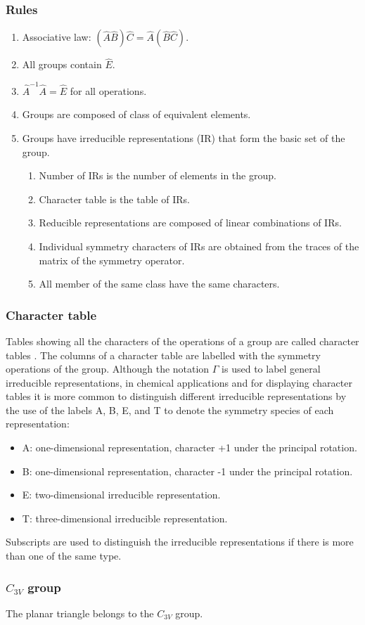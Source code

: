 \documentclass[letterpaper]{article}
\begin{document}
\subsubsection*{Rules}
\begin{enumerate}
    \item Associative law: $(\hat{A}\hat{B})\hat{C}=\hat{A}(\hat{B}\hat{C})$.
    \item All groups contain $\hat{E}$.
    \item $\hat{A}^{-1}\hat{A}=\hat{E}$ for all operations.
    \item Groups are composed of class of equivalent elements.
    \item Groups have irreducible representations (IR) that form the basic set of the group.
          \begin{enumerate}
              \item Number of IRs is the number of elements in the group.
              \item Character table is the table of IRs.
              \item Reducible representations are composed of linear combinations of IRs.
              \item Individual symmetry characters of IRs are obtained from  the traces of the matrix
                    of the symmetry operator.
              \item All member of the same class have the same characters.
          \end{enumerate}
\end{enumerate}

\subsubsection*{Character table}
Tables showing all the characters of the operations of a group are called character tables . The columns of a character table are
labelled with the symmetry operations of the group. Although the notation $\Gamma$ is used to label general irreducible representations,
in chemical applications and for displaying character tables it is more common to distinguish different irreducible representations by the use of the labels A, B, E, and T to denote
the symmetry species of each representation:
\begin{itemize}
    \item A: one-dimensional representation, character +1 under the principal rotation.
    \item B: one-dimensional representation, character -1 under the principal rotation.
    \item E: two-dimensional irreducible representation.
    \item T: three-dimensional irreducible representation.
\end{itemize}
Subscripts are used to distinguish the irreducible representations if there is more than one of the same type.

\subsubsection*{$C_{3V}$ group}
The planar triangle belongs to the $C_{3V}$ group.
\end{document}

